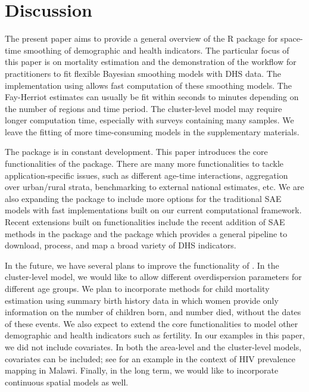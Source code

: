 \section{Discussion}\label{discussion}

The present paper aims to provide a general overview of the R package  for space-time smoothing of demographic and health indicators. The particular focus of this paper is on mortality estimation and the demonstration of the workflow for practitioners to fit flexible Bayesian smoothing models with DHS data. The implementation using  allows fast computation of these smoothing models. The Fay-Herriot estimates can usually be fit within seconds to minutes depending on the number of regions and time period. The cluster-level model may require longer computation time, especially with surveys containing many samples. We leave the fitting of more time-consuming models in the supplementary materials.

The  package is in constant development. This paper introduces the core functionalities of the package. There are many more functionalities to tackle application-specific issues, such as different age-time interactions, aggregation over urban/rural strata, benchmarking to external national estimates, etc. We are also expanding the package to include more options for the traditional SAE models with fast implementations built on our current computational framework. Recent extensions built on  functionalities include the recent addition of SAE methods in the  package \citep{survey44} and the  package \citep{surveyPrev} which provides a general pipeline to download, process, and map a broad variety of DHS indicators.

In the future, we have several plans to improve the functionality of . In the cluster-level model, we would like to allow different overdispersion parameters for different age groups. We plan to incorporate methods for child mortality estimation using summary birth history data \citep{hill_etal_15, wilson2021child} in which women provide only information on the number of children born, and number died, without the dates of these events. We also expect to extend the core functionalities to model other demographic and health indicators such as fertility. In our examples in this paper, we did not include covariates. In both the area-level and the cluster-level models, covariates can be included; see \citet{wakefield_okonek_pedersen_20} for an example in the context of HIV prevalence mapping in Malawi. Finally, in the long term, we would like to incorporate continuous spatial models as well.

